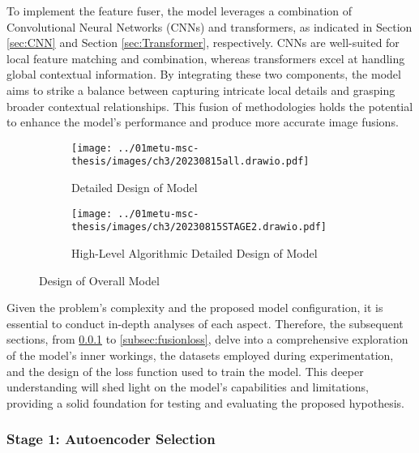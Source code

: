 To implement the feature fuser, the model leverages a combination of Convolutional Neural Networks (CNNs) and transformers, as indicated in Section \ref{sec:CNN} and Section \ref{sec:Transformer}, respectively. CNNs are well-suited for local feature matching and combination, whereas transformers excel at handling global contextual information. By integrating these two components, the model aims to strike a balance between capturing intricate local details and grasping broader contextual relationships. This fusion of methodologies holds the potential to enhance the model's performance and produce more accurate image fusions.

\begin{figure}[htbp]
    \centering
    \begin{subfigure}[b]{\textwidth}
        \texttt{[image: ../01metu-msc-thesis/images/ch3/20230815all.drawio.pdf]}
        \caption{Detailed Design of Model}
        \label{fig:ch3:highlevel}
    \end{subfigure}
    \vspace{0.01cm}
    \begin{subfigure}[b]{\textwidth}
        \texttt{[image: ../01metu-msc-thesis/images/ch3/20230815STAGE2.drawio.pdf]}
        \caption{High-Level Algorithmic Detailed Design of Model}
        \label{fig:ch3:highlevel2}
    \end{subfigure}
    \caption{Design of Overall Model}
    \label{fig:ch3:rfnnest}
\end{figure}

Given the problem's complexity and the proposed model configuration, it is essential to conduct in-depth analyses of each aspect. Therefore, the subsequent sections, from \ref{subsec:aesel} to \ref{subsec:fusionloss}, delve into a comprehensive exploration of the model's inner workings, the datasets employed during experimentation, and the design of the loss function used to train the model. This deeper understanding will shed light on the model's capabilities and limitations, providing a solid foundation for testing and evaluating the proposed hypothesis.

\subsubsection{Stage 1: Autoencoder Selection} \label{subsec:aesel}

